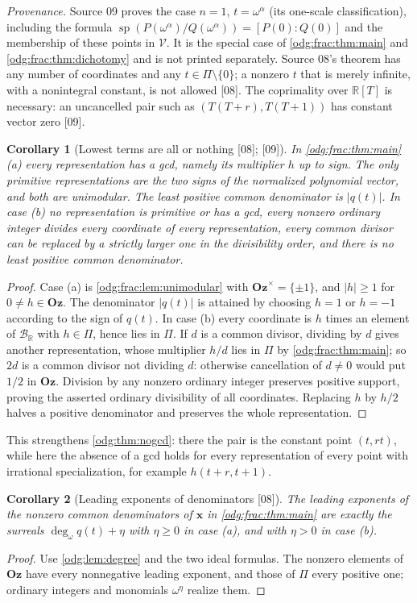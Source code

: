 \documentclass[11pt,oneside]{article}
\numberwithin{equation}{section}
\newtheorem{corollary}[corollary]{Corollary}
\theoremstyle{definition}
\theoremstyle{remark}
\newcommand{\Oz}{\mathbf{Oz}}
\newcommand{\R}{\mathbb R}
\newcommand{\BR}{\mathcal B_{\R}}
\newcommand{\ddeg}{\operatorname{deg}_{\omega}}
\newcommand{\src}[1]{\textup{\textsf{\small[#1]}}}
\newcommand{\status}[1]{\par\smallskip\noindent\textit{Provenance.} #1\par\smallskip}
\newcommand{\spz}{\operatorname{sp}}
\newcommand{\Vreg}{\mathcal V}
\begin{document}
\status{Source 09 proves the case $n=1$, $t=\omega^\alpha$ (its one-scale
classification), including the formula
$\spz(P(\omega^\alpha)/Q(\omega^\alpha))=[P(0):Q(0)]$ and the membership of
these points in $\Vreg$. It is the special case of \cref{odg:frac:thm:main} and
\cref{odg:frac:thm:dichotomy} and is not printed separately. Source 08's
theorem has any number of coordinates and any $t\in\Pi\setminus\{0\}$; a nonzero
$t$ that is merely infinite, with a nonintegral constant, is not allowed
\src{08}. The coprimality over $\R[T]$ is necessary: an uncancelled pair such as
$(T(T+r),T(T+1))$ has constant vector zero \src{09}.}

\begin{corollary}[Lowest terms are all or nothing \src{08}; \src{09}]\label{odg:frac:cor:lowest}
In \cref{odg:frac:thm:main}(a) every representation has a gcd, namely its
multiplier $h$ up to sign. The only primitive representations are the two signs
of the normalized polynomial vector, and both are unimodular. The least positive
common denominator is $|q(t)|$. In case (b) no representation is primitive or
has a gcd, every nonzero ordinary integer divides every coordinate of every
representation, every common divisor can be replaced by a strictly larger one
in the divisibility order, and there is no least positive common denominator.
\end{corollary}
\begin{proof}
Case (a) is \cref{odg:frac:lem:unimodular} with $\Oz^\times=\{\pm1\}$, and
$|h|\ge1$ for $0\ne h\in\Oz$. The denominator $|q(t)|$ is attained by
choosing $h=1$ or $h=-1$ according to the sign of $q(t)$.
In case (b) every coordinate is $h$ times an
element of $\BR$ with $h\in\Pi$, hence lies in $\Pi$. If $d$ is a common
divisor, dividing by $d$ gives another representation, whose multiplier $h/d$
lies in $\Pi$ by \cref{odg:frac:thm:main}; so $2d$ is a common divisor not
dividing $d$: otherwise cancellation of $d\ne0$ would put $1/2$ in $\Oz$.
Division by any nonzero ordinary integer preserves positive support, proving
the asserted ordinary divisibility of all coordinates. Replacing $h$ by
$h/2$ halves a positive denominator and preserves the whole representation.
\end{proof}

This strengthens \cref{odg:thm:nogcd}: there the pair is the constant point
$(t,rt)$, while here the absence of a gcd holds for every representation of
every point with irrational specialization, for example $h(t+r,t+1)$.

\begin{corollary}[Leading exponents of denominators \src{08}]\label{odg:frac:cor:spectrum}
The leading exponents of the nonzero common denominators of $\mathbf x$ in
\cref{odg:frac:thm:main} are exactly the surreals $\ddeg q(t)+\eta$ with
$\eta\ge0$ in case (a), and with $\eta>0$ in case (b).
\end{corollary}
\begin{proof}
Use \cref{odg:lem:degree} and the two ideal formulas. The nonzero elements of
$\Oz$ have every nonnegative leading exponent, and those of $\Pi$ every
positive one; ordinary integers and monomials $\omega^\eta$ realize them.
\end{proof}
\end{document}
